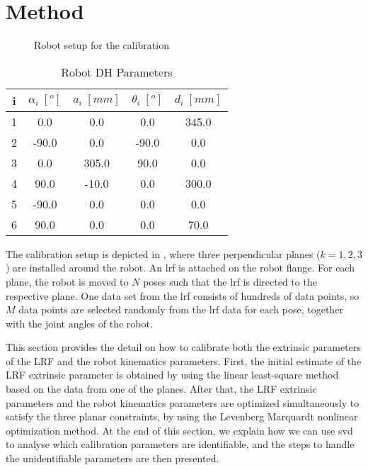 \section{Method}
\label{sec:method}
\begin{figure}[t]
  \centering
  \vspace*{2mm}
  \caption{Robot setup for the calibration}
  \label{fig:robot_setup}
\end{figure}


\renewcommand{\arraystretch}{1.5}
\begin{table}[htp]
\caption{Robot DH Parameters}
\label{tab:dh_params}
\centering
\begin{tabular}{c c c c c}
\toprule
i &  \textbf{$\alpha_i \;[^o]$} & \textbf{$a_i \;[mm]$} &  \textbf{$\theta_i \;[^o]$}  & \textbf{$d_i \;[mm]$}\\
\midrule
1 & 0.0 & 0.0 & 0.0 & 345.0\\
2 & -90.0 & 0.0 & -90.0 & 0.0\\
3 & 0.0 & 305.0 & 90.0 & 0.0\\
4 & 90.0 & -10.0 & 0.0 & 300.0\\
5 & -90.0 & 0.0 & 0.0 & 0.0\\
6 & 90.0 & 0.0 & 0.0 & 70.0\\
\bottomrule
\end{tabular}
\end{table}

The calibration setup is depicted in , where three perpendicular planes ($k=1,2,3$) are installed around the robot. An \ac{lrf} is attached on the robot flange. For each plane, the robot is moved to $N$ poses such that the \ac{lrf} is directed to the respective plane. One data set from the \ac{lrf} consists of hundreds of data points, so $M$ data points are selected randomly from the \ac{lrf} data for each pose, together with the joint angles of the robot. 

This section provides the detail on how to calibrate both the extrinsic parameters of the LRF and the robot kinematics parameters. First, the initial estimate of the LRF extrinsic parameter is obtained by using the linear least-square method based on the data from one of the planes. After that, the LRF extrinsic parameters and the robot kinematics parameters are optimized simultaneously to satisfy the three planar constraints, by using the Levenberg Marquardt nonlinear optimization method. At the end of this section, we explain how we can use \ac{svd} to analyse which calibration parameters are identifiable, and the steps to handle the unidentifiable parameters are then presented. 
